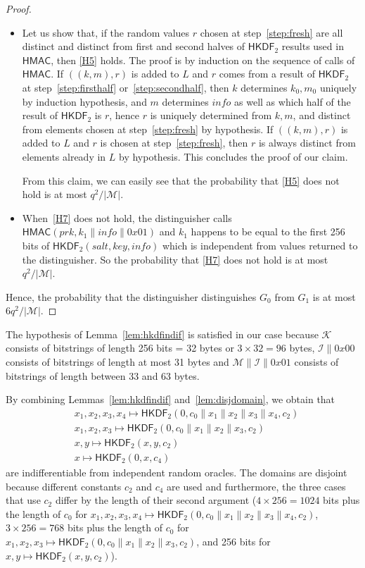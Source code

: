 \documentclass[compsoc, conference, letterpaper, 10pt, times]{IEEEtran}
\newcommand{\HKDF}{\mathsf{HKDF}}
\newcommand{\hkdftwo}{\HKDF_2}
\newcommand{\salt}{\mathit{salt}}
\newcommand{\key}{\mathit{key}}
\newcommand{\info}{\mathit{info}}
\newcommand{\prk}{\mathit{prk}}
\newcommand{\hmac}{\mathsf{HMAC}}
\newcommand{\Skey}{\mathcal{K}}
\newcommand{\Sinfo}{\mathcal{I}}
\newcommand{\Smac}{\mathcal{M}}
\begin{document}
\begin{proof}
\begin{itemize}
\item Let us show that, if the random values $r$ chosen at step~\ref{step:fresh} are all distinct and distinct from first and second halves of $\hkdftwo$ results used in $\hmac$, then \ref{H5} holds. The proof is by induction on the sequence of calls of $\hmac$.
%
  If $((k,m),r)$ is added to $L$ and $r$ comes from a result of $\hkdftwo$ at step~\ref{step:firsthalf} or~\ref{step:secondhalf}, then $k$ determines $k_0,m_0$ uniquely by induction hypothesis, and $m$ determines $\info$ as well as which half of the result of $\hkdftwo$ is $r$, hence $r$ is uniquely determined from $k,m$, and distinct from elements chosen at step~\ref{step:fresh} by hypothesis.
  If $((k,m),r)$ is added to $L$ and $r$ is chosen at step~\ref{step:fresh}, then $r$ is always distinct from elements already in $L$ by hypothesis.
% 
  This concludes the proof of our claim.
  
  From this claim, we can easily see that the probability that \ref{H5} does not hold is at most $q^2/|\Smac|$.

\item When~\ref{H7} does not hold, the distinguisher calls $\hmac(\prk, k_1\|\info\|0x01)$ and $k_1$ happens to be equal to the first 256 bits of $\hkdftwo(\salt,\key,\info)$ which is independent from values returned to the distinguisher. 
So the probability that \ref{H7} does not hold is at most  $q^2/|\Smac|$.  

\end{itemize}
Hence, the probability that the distinguisher distinguishes $G_0$ from $G_1$ is at most $6 q^2/|\Smac|$.
\end{proof}

The hypothesis of Lemma~\ref{lem:hkdfindif} is satisfied in our case
because $\Skey$ consists of bitstrings of length 256 bits = 32 bytes or $3 \times 32 = 96$ bytes,
$\Sinfo \| 0x00$ consists of bitstrings of length at most 31 bytes
and $\Smac \| \Sinfo \| 0x01$ consists of bitstrings of length between 33 and 63 bytes.


By combining Lemmas~\ref{lem:hkdfindif} and~\ref{lem:disjdomain}, we obtain that
\begin{align*}
&x_1,x_2,x_3,x_4 \mapsto \hkdftwo(0, c_0 \| x_1 \| x_2 \| x_3 \| x_4, c_2)\\
&x_1,x_2,x_3 \mapsto \hkdftwo(0, c_0 \| x_1 \| x_2 \| x_3, c_2)\\
&x,y \mapsto \hkdftwo(x,y,c_2)\\
 &x \mapsto \hkdftwo(0,x,c_4)
\end{align*}
are indifferentiable from independent random oracles.
The domains are disjoint 
because different constants $c_2$ and $c_4$ are used and furthermore, the three cases that use $c_2$ differ by the length of their second argument ($4 \times 256 = 1024$ bits plus the length of $c_0$ for
$x_1,x_2,x_3,x_4 \mapsto \hkdftwo(0, c_0 \| x_1 \| x_2 \| x_3 \| x_4, c_2)$,
$3 \times 256 = 768$ bits plus the length of $c_0$ for 
$x_1,x_2,x_3 \mapsto \hkdftwo(0, c_0 \| x_1 \| x_2 \| x_3, c_2)$, and 256 bits for $x,y \mapsto \hkdftwo(x,y,c_2)$).
\end{document}
